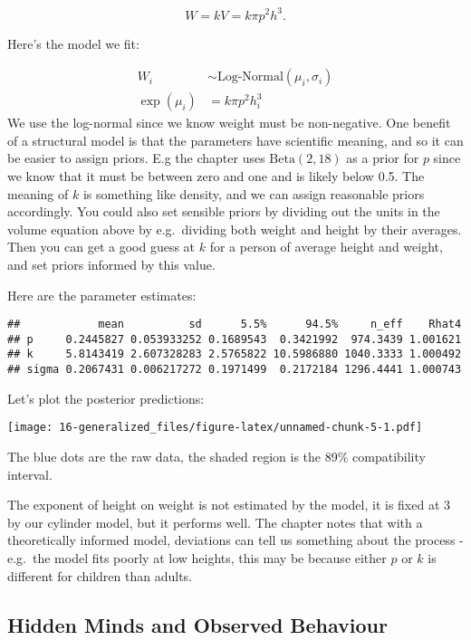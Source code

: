 \documentclass[
]{book}
\begin{document}
\[
W = kV = k\pi p^2 h^3.
\]

Here's the model we fit:

\[
\begin{aligned}
W_{i} &\sim \text{Log-Normal}(\mu_{i},\sigma_{i}) \\
\exp(\mu_i) &= k \pi p^2 h_i^3
\end{aligned}
\]
We use the log-normal since we know weight must be non-negative. One benefit of a structural model is that the parameters have scientific meaning, and so it can be easier to assign priors. E.g the chapter uses \(\text{Beta}(2,18)\) as a prior for \(p\) since we know that it must be between zero and one and is likely below 0.5. The meaning of \(k\) is something like density, and we can assign reasonable priors accordingly.
You could also set sensible priors by dividing out the units in the volume equation above by e.g.~dividing both weight and height by their averages. Then you can get a good guess at \(k\) for a person of average height and weight, and set priors informed by this value.

Here are the parameter estimates:

\begin{verbatim}
##            mean          sd      5.5%      94.5%     n_eff    Rhat4
## p     0.2445827 0.053933252 0.1689543  0.3421992  974.3439 1.001621
## k     5.8143419 2.607328283 2.5765822 10.5986880 1040.3333 1.000492
## sigma 0.2067431 0.006217272 0.1971499  0.2172184 1296.4441 1.000743
\end{verbatim}

Let's plot the posterior predictions:

\texttt{[image: 16-generalized\_files/figure-latex/unnamed-chunk-5-1.pdf]}

The blue dots are the raw data, the shaded region is the 89\% compatibility interval.

The exponent of height on weight is not estimated by the model, it is fixed at 3 by our cylinder model, but it performs well. The chapter notes that with a theoretically informed model, deviations can tell us something about the process - e.g.~the model fits poorly at low heights, this may be because either \(p\) or \(k\) is different for children than adults.

\hypertarget{hidden-minds-and-observed-behaviour}{%
\subsection*{Hidden Minds and Observed Behaviour}\label{hidden-minds-and-observed-behaviour}}
\end{document}
